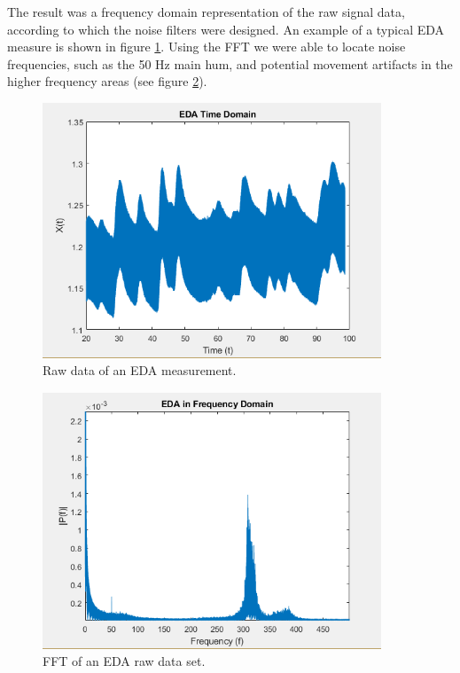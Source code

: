 The result was a frequency domain representation of the raw signal data, according to which the noise filters were designed. An example of a typical EDA measure is shown in figure \ref{rawEDAImg}. Using the FFT we were able to locate noise frequencies, such as the 50 Hz main hum, and potential movement artifacts in the higher frequency areas (see figure \ref{fftEDAImg}).

\begin{figure}[ht]
\centering
\includegraphics[width=0.9\textwidth]{images/rawEDA.png}
\caption{Raw data of an EDA measurement.}
\label{rawEDAImg}
\end{figure}

\begin{figure}[ht]
\centering
\includegraphics[width=0.9\textwidth]{images/fftEDA.png}
\caption{FFT of an EDA raw data set.}
\label{fftEDAImg}
\end{figure}

